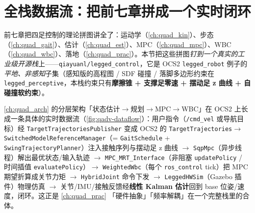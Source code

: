 \section{全栈数据流：把前七章拼成一个实时闭环}
\label{sec:qadv-stack}

前七章把四足控制的理论拼图讲全了：运动学（\cref{ch:quad_kin}）、步态（\cref{ch:quad_gait}）、估计（\cref{ch:quad_est}）、MPC（\cref{ch:quad_mpc}）、WBC（\cref{ch:quad_wbc}）、落地（\cref{ch:quad_prac}）。本节把这些拼图\emph{钉到一个真实的工业级开源栈}上——\texttt{qiayuanl/\allowbreak legged\_control}，它是 OCS2 \texttt{legged\_robot} 例子的\emph{平地、非感知}子集（感知版的高程图 / SDF 碰撞 / 落脚多边形约束在 \texttt{legged\_perceptive}，本栈约束只有\textbf{摩擦锥 + 支撑足零速 + 摆动足 z 曲线 + 自碰撞软约束}）\cite{grandia2022perceptive,liao2023walking}。

\begin{insight}\label{ins:qadv-dataflow}
\cref{ch:quad_arch} 的分层架构「状态估计$\to$规划$\to$MPC$\to$WBC」在 OCS2 上长成一条具体的实时数据流（\cref{fig:qadv-dataflow}）：用户指令（\texttt{/cmd\_vel} 或导航目标）经 \texttt{TargetTrajectoriesPublisher} 变成 OCS2 的 \texttt{TargetTrajectories}$\to$ \texttt{SwitchedModelReferenceManager}（= \texttt{GaitSchedule} + \texttt{SwingTrajectoryPlanner}）注入接触序列与摆动足 z 曲线 $\to$ \texttt{SqpMpc}（异步线程）解出最优状态/输入轨迹 $\to$ \texttt{MPC\_MRT\_Interface}（非阻塞 \texttt{updatePolicy} / 时间插值 \texttt{evaluatePolicy}）$\to$ \texttt{WeightedWbc}（每个 \texttt{ros\_control} tick）把 MPC 期望折算成关节力矩 $\to$ \texttt{HybridJoint} 命令下发 $\to$ \texttt{LeggedHWSim}（Gazebo 插件）物理仿真 $\to$ 关节/IMU/接触反馈经\textbf{线性 Kalman 估计}回到 base 位姿/速度，闭环。这正是 \cref{ch:quad_prac} 「硬件抽象」「频率解耦」在一个完整栈里的合体。
\end{insight}

